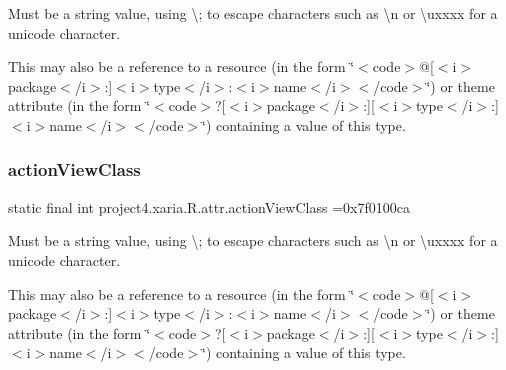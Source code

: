 Must be a string value, using \textquotesingle{}\textbackslash{};\textquotesingle{} to escape characters such as \textquotesingle{}\textbackslash{}n\textquotesingle{} or \textquotesingle{}\textbackslash{}uxxxx\textquotesingle{} for a unicode character. 

This may also be a reference to a resource (in the form \char`\"{}$<$code$>$@\mbox{[}$<$i$>$package$<$/i$>$\+:\mbox{]}$<$i$>$type$<$/i$>$\+:$<$i$>$name$<$/i$>$$<$/code$>$\char`\"{}) or theme attribute (in the form \char`\"{}$<$code$>$?\mbox{[}$<$i$>$package$<$/i$>$\+:\mbox{]}\mbox{[}$<$i$>$type$<$/i$>$\+:\mbox{]}$<$i$>$name$<$/i$>$$<$/code$>$\char`\"{}) containing a value of this type. \mbox{\label{classproject4_1_1xaria_1_1R_1_1attr_a8777391ce266f69c00b440e2d0e0c6a6}} 
\subsubsection{\texorpdfstring{action\+View\+Class}{actionViewClass}}
{\footnotesize\ttfamily static final int project4.\+xaria.\+R.\+attr.\+action\+View\+Class =0x7f0100ca\hspace{0.3cm}{\ttfamily [static]}}

Must be a string value, using \textquotesingle{}\textbackslash{};\textquotesingle{} to escape characters such as \textquotesingle{}\textbackslash{}n\textquotesingle{} or \textquotesingle{}\textbackslash{}uxxxx\textquotesingle{} for a unicode character. 

This may also be a reference to a resource (in the form \char`\"{}$<$code$>$@\mbox{[}$<$i$>$package$<$/i$>$\+:\mbox{]}$<$i$>$type$<$/i$>$\+:$<$i$>$name$<$/i$>$$<$/code$>$\char`\"{}) or theme attribute (in the form \char`\"{}$<$code$>$?\mbox{[}$<$i$>$package$<$/i$>$\+:\mbox{]}\mbox{[}$<$i$>$type$<$/i$>$\+:\mbox{]}$<$i$>$name$<$/i$>$$<$/code$>$\char`\"{}) containing a value of this type. \mbox{\label{classproject4_1_1xaria_1_1R_1_1attr_a4e388f084ee32be85c781d07c0eddf1d}} 
